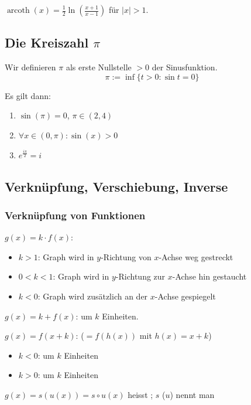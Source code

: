 $\operatorname{arcoth}(x)=\frac{1}{2}\ln(\frac{x+1}{x-1})$ für $|x|>1$.

\subsection{Die Kreiszahl $\pi$}

	Wir definieren $\pi$ als erste Nullstelle $ > 0$ der Sinusfunktion.
	$$\pi := \inf \{ t > 0 : \sin t = 0 \}$$

Es gilt dann:
\begin{enumerate}[label = (\arabic*)]
	\item $\sin (\pi) = 0$, $\pi \in (2,4)$
	\item $\forall x \in (0, \pi) : \sin (x) > 0$
	\item $e^{\frac{i \pi}{2}} = i$
\end{enumerate}

\subsection{Verknüpfung, Verschiebung, Inverse}
\subsubsection{Verknüpfung von Funktionen}
$g(x) = k \cdot f(x)$: 
\begin{itemize}
    \item $k>1$: Graph wird in $y$-Richtung von $x$-Achse weg gestreckt
    \item $0 < k < 1$: Graph wird in $y$-Richtung zur $x$-Achse hin gestaucht
    \item $k<0$: Graph wird zusätzlich an der $x$-Achse gespiegelt
\end{itemize}

$g(x)=k+f(x)$:  um $k$ Einheiten.

$g(x)=f(x+k)$: ($= f(h(x))$ mit $h(x)=x+k$)
\begin{itemize}
    \item $k<0$:  um $k$ Einheiten
    \item $k>0$:  um $k$ Einheiten
\end{itemize}


$g(x)=s(u(x)) = s \circ u(x)$ heisst  ; $s$ ($u$) nennt man 


